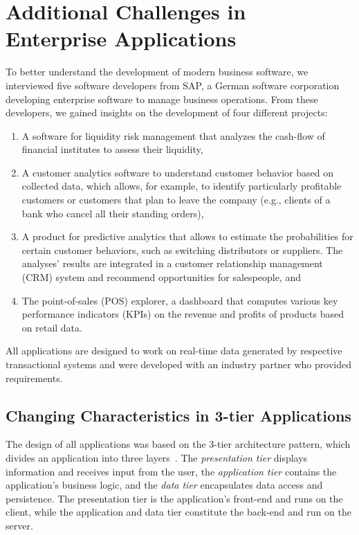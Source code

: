 
\section{Additional Challenges in Enterprise Applications}
\label{sec:enterprise_applications}

\tmpStart
To better understand the development of modern business software, we interviewed five software developers from SAP, a German software corporation developing enterprise software to manage business operations.
From these developers, we gained insights on the development of four different projects:
\begin{enumerate}
	\item A software for liquidity risk management that analyzes the cash-flow of financial institutes to assess their liquidity,
	\item A customer analytics software to understand customer behavior based on collected data, which allows, for example, to identify particularly profitable customers or customers that plan to leave the company (e.g., clients of a bank who cancel all their standing orders),
	\item A product for predictive analytics that allows to estimate the probabilities for certain customer behaviors, such as switching distributors or suppliers. The analyses' results are integrated in a customer relationship management (CRM) system and recommend opportunities for salespeople, and
	\item The point-of-sales (POS) explorer, a dashboard that computes various key performance indicators (KPIs) on the revenue and profits of products based on retail data.
\end{enumerate}
%
All applications are designed to work on real-time data generated by respective transactional systems and were developed with an industry partner who provided requirements.

\subsection{Changing Characteristics in 3-tier Applications}

The design of all applications was based on the 3-tier architecture pattern, which divides an application into three layers~\cite{eckerson95:three_tier_clientserver_architecture}.
The \emph{presentation tier} displays information and receives input from the user,
the \emph{application tier} contains the application's business logic, and
the \emph{data tier} encapsulates data access and persistence.
The presentation tier is the application's front-end and runs on the client, while the application and data tier constitute the back-end and run on the server.

